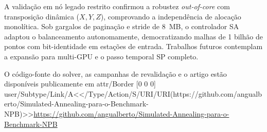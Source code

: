 \documentclass[12pt]{article}
\begin{document}
A validação em nó legado restrito confirmou a robustez \textit{out-of-core} com transposição dinâmica ($X,Y,Z$), comprovando a independência de alocação monolítica. Sob gargalos de paginação e stride de 8~MB, o controlador SA adaptou o balanceamento autonomamente, democratizando malhas de 1 bilhão de pontos com bit-identidade em estações de entrada. Trabalhos futuros contemplam a expansão para multi-GPU e o passo temporal SP completo.

O código-fonte do solver, as campanhas de revalidação e o artigo estão
disponíveis publicamente em
\pdfstartlink attr{/Border [0 0 0]} user{/Subtype/Link/A<</Type/Action/S/URI/URI(https://github.com/angualberto/Simulated-Annealing-para-o-Benchmark-NPB)>>}\url{https://github.com/angualberto/Simulated-Annealing-para-o-Benchmark-NPB}\pdfendlink



\end{document}
